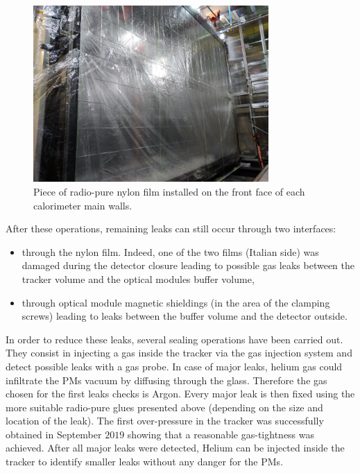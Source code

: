 \begin{figure}[h!]
\centering
\includegraphics[width=0.8\textwidth]{SNdemonstrator/fig_SNdemonstrator/Nylon_film.jpg}
\caption{Piece of radio-pure nylon film installed on the front face of each calorimeter main walls.
\label{fig:nylon_film}}
\end{figure}

After these operations, remaining leaks can still occur through two interfaces:
\begin{itemize}
\item through the nylon film.
  Indeed, one of the two films (Italian side) was damaged during the detector closure leading to possible gas leaks between the tracker volume and the optical modules buffer volume,
\item through optical module magnetic shieldings (in the area of the clamping screws) leading to leaks between the buffer volume and the detector outside.
\end{itemize}
In order to reduce these leaks, several sealing operations have been carried out.
They consist in injecting a gas inside the tracker via the gas injection system and detect possible leaks with a gas probe.
In case of major leaks, helium gas could infiltrate the PMs vacuum by diffusing through the glass.
Therefore the gas chosen for the first leaks checks is Argon.
Every major leak is then fixed using the more suitable radio-pure glues presented above (depending on the size and location of the leak).
The first over-pressure in the tracker was successfully obtained in September $2019$ showing that a reasonable gas-tightness was achieved.
After all major leaks were detected, Helium can be injected inside the tracker to identify smaller leaks without any danger for the PMs.



